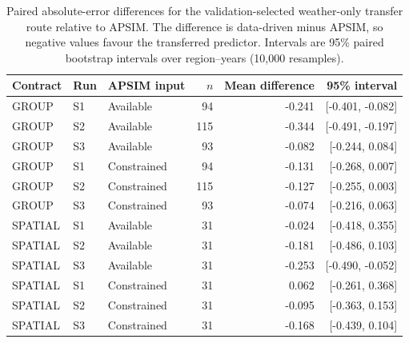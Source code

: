 \begin{table}[tb]
\centering
\caption{Paired absolute-error differences for the validation-selected weather-only transfer route relative to APSIM. The difference is data-driven minus APSIM, so negative values favour the transferred predictor. Intervals are 95\% paired bootstrap intervals over region--years (10,000 resamples).}
\label{tab:apsim-paired}
\small
\begin{tabular}{lllr rr}
\toprule
Contract & Run & APSIM input & $n$ & Mean difference & 95\% interval\\
\midrule
GROUP & S1 & Available & 94 & -0.241 & [-0.401, -0.082]\\
GROUP & S2 & Available & 115 & -0.344 & [-0.491, -0.197]\\
GROUP & S3 & Available & 93 & -0.082 & [-0.244, 0.084]\\
GROUP & S1 & Constrained & 94 & -0.131 & [-0.268, 0.007]\\
GROUP & S2 & Constrained & 115 & -0.127 & [-0.255, 0.003]\\
GROUP & S3 & Constrained & 93 & -0.074 & [-0.216, 0.063]\\
SPATIAL & S1 & Available & 31 & -0.024 & [-0.418, 0.355]\\
SPATIAL & S2 & Available & 31 & -0.181 & [-0.486, 0.103]\\
SPATIAL & S3 & Available & 31 & -0.253 & [-0.490, -0.052]\\
SPATIAL & S1 & Constrained & 31 & 0.062 & [-0.261, 0.368]\\
SPATIAL & S2 & Constrained & 31 & -0.095 & [-0.363, 0.153]\\
SPATIAL & S3 & Constrained & 31 & -0.168 & [-0.439, 0.104]\\
\bottomrule
\end{tabular}
\end{table}
